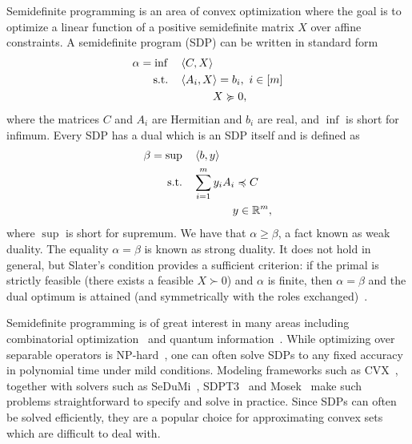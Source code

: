 Semidefinite programming is an area of convex optimization where the goal is to optimize a linear function of a positive semidefinite matrix $X$ over affine constraints. 
A semidefinite program (SDP) can be written in standard form
    \begin{equation*}    
        \begin{aligned}
            \alpha = \inf \quad & \left\langle C, X \right\rangle \\
            \textrm{s.t.} \quad & \left\langle A_i, X \right\rangle = b_i,\ i \in [m] \\
            & \hspace{30pt} X \succcurlyeq 0,
        \end{aligned}
    \end{equation*}
where the matrices $C$ and $A_i$ are Hermitian and $b_i$ are real, and $\inf$ is short for infimum. 
Every SDP has a dual which is an SDP itself and is defined as 
    \begin{equation}
        \label{eq:power_rangers_SPD}
        \begin{aligned}
            \beta = \sup \quad & \left\langle b, y \right\rangle \\
            \textrm{s.t.} \quad & \sum_{i=1}^m y_i A_i \preccurlyeq C \\
            & \hspace{35pt} y \in \mathbb{R}^m,  
        \end{aligned}
    \end{equation}     
where $\sup$ is short for supremum.
We have that $\alpha \geq \beta$, a fact known as weak duality. 
The equality $\alpha = \beta$ is known as strong duality. 
It does not hold in general, but Slater's condition provides a sufficient criterion: if the primal is strictly feasible (there exists a feasible $X \succ 0$) and $\alpha$ is finite, then $\alpha = \beta$ and the dual optimum is attained (and symmetrically with the roles exchanged)~\cite{boyd2004convex}.

Semidefinite programming is of great interest in many areas including combinatorial optimization~\cite{tunccel2016polyhedral} and quantum information~\cite{watrous2018theory}.
While optimizing over separable operators is NP-hard~\cite{gurvits2004classical, gharibian2010strong}, one can often solve SDPs to any fixed accuracy in polynomial time under mild conditions.
Modeling frameworks such as CVX~\cite{grant2014cvx}, together with solvers such as SeDuMi~\cite{sturm1999using}, SDPT3~\cite{toh1999sdpt3} and Mosek~\cite{andersen2000mosek} make such problems straightforward to specify and solve in practice. 
Since SDPs can often be solved efficiently, they are a popular choice for approximating convex sets which are difficult to deal with.%